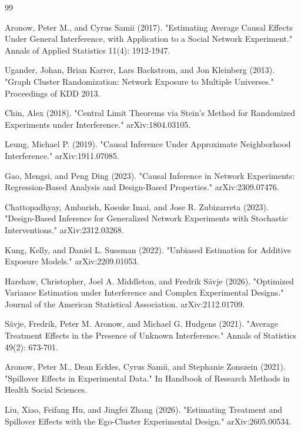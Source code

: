 \documentclass{article}
\begin{document}
\begin{thebibliography}{99}

   Aronow, Peter M., and Cyrus Samii (2017). "Estimating Average Causal Effects Under General Interference, with Application to a Social Network Experiment." Annals of Applied Statistics 11(4): 1912-1947.

   Ugander, Johan, Brian Karrer, Lars Backstrom, and Jon Kleinberg (2013). "Graph Cluster Randomization: Network Exposure to Multiple Universes." Proceedings of KDD 2013.

   Chin, Alex (2018). "Central Limit Theorems via Stein's Method for Randomized Experiments under Interference." arXiv:1804.03105.

   Leung, Michael P. (2019). "Causal Inference Under Approximate Neighborhood Interference." arXiv:1911.07085.

   Gao, Mengsi, and Peng Ding (2023). "Causal Inference in Network Experiments: Regression-Based Analysis and Design-Based Properties." arXiv:2309.07476.

   Chattopadhyay, Ambarish, Kosuke Imai, and Jose R. Zubizarreta (2023). "Design-Based Inference for Generalized Network Experiments with Stochastic Interventions." arXiv:2312.03268.

   Kung, Kelly, and Daniel L. Sussman (2022). "Unbiased Estimation for Additive Exposure Models." arXiv:2209.01053.

   Harshaw, Christopher, Joel A. Middleton, and Fredrik Sävje (2026). "Optimized Variance Estimation under Interference and Complex Experimental Designs." Journal of the American Statistical Association. arXiv:2112.01709.

   Sävje, Fredrik, Peter M. Aronow, and Michael G. Hudgens (2021). "Average Treatment Effects in the Presence of Unknown Interference." Annals of Statistics 49(2): 673-701.

   Aronow, Peter M., Dean Eckles, Cyrus Samii, and Stephanie Zonszein (2021). "Spillover Effects in Experimental Data." In Handbook of Research Methods in Health Social Sciences.

   Liu, Xiao, Feifang Hu, and Jingfei Zhang (2026). "Estimating Treatment and Spillover Effects with the Ego-Cluster Experimental Design." arXiv:2605.00534.

\end{thebibliography}
\end{document}
